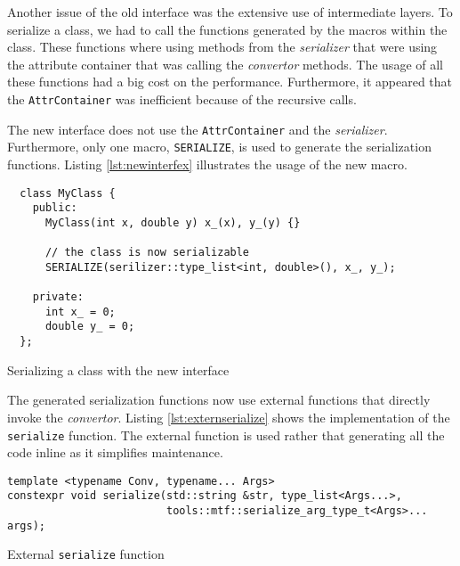 Another issue of the old interface was the extensive use of intermediate layers.
To serialize a class, we had to call the functions generated by the macros
within the class. These functions where using methods from the
\textit{serializer} that were using the attribute container that was calling the
\textit{convertor} methods. The usage of all these functions had a big cost on
the performance. Furthermore, it appeared that the \texttt{AttrContainer} was
inefficient because of the recursive calls.

The new interface does not use the \texttt{AttrContainer} and the
\textit{serializer}. Furthermore, only one macro, \texttt{SERIALIZE}, is used to
generate the serialization functions. Listing \ref{lst:newinterfex} illustrates
the usage of the new macro.

\begin{listing}[ht!]
\begin{verbatim}
  class MyClass {
    public:
      MyClass(int x, double y) x_(x), y_(y) {}

      // the class is now serializable
      SERIALIZE(serilizer::type_list<int, double>(), x_, y_);

    private:
      int x_ = 0;
      double y_ = 0;
  };
\end{verbatim}
\caption{Serializing a class with the new interface}
\label{lst:newinterfex}
\end{listing}

The generated serialization functions now use external functions that directly
invoke the \textit{convertor}. Listing \ref{lst:externserialize} shows the
implementation of the \texttt{serialize} function. The external function is used
rather that generating all the code inline as it simplifies maintenance.

\clearpage{}
\begin{listing}[ht!]
\begin{verbatim}
template <typename Conv, typename... Args>
constexpr void serialize(std::string &str, type_list<Args...>,
                         tools::mtf::serialize_arg_type_t<Args>... args);
\end{verbatim}
\caption{External \texttt{serialize} function}
\label{lst:externserialize}
\end{listing}


